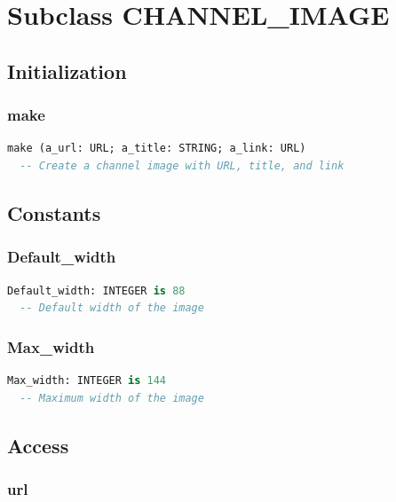 \section{Subclass CHANNEL\_IMAGE}
\label{sec:channel-image}

\subsection{Initialization}
\label{sec:channel-image-initialization}

\subsubsection{make}

\begin{lstlisting}[language=Eiffel]
make (a_url: URL; a_title: STRING; a_link: URL)
  -- Create a channel image with URL, title, and link
\end{lstlisting}

\subsection{Constants}
\label{sec:channel-image-constants}

\subsubsection{Default\_width}

\begin{lstlisting}[language=Eiffel]
Default_width: INTEGER is 88
  -- Default width of the image
\end{lstlisting}

\subsubsection{Max\_width}

\begin{lstlisting}[language=Eiffel]
Max_width: INTEGER is 144
  -- Maximum width of the image
\end{lstlisting}

\subsection{Access}
\label{sec:channel-image-access}

\subsubsection{url}

